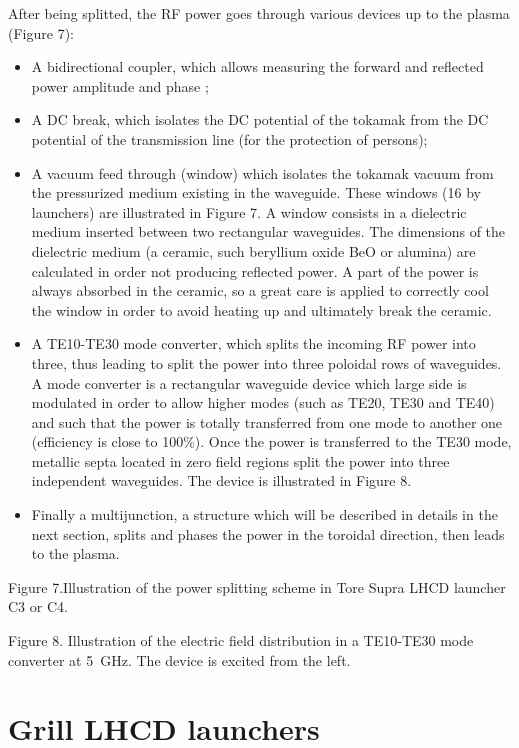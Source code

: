 After being splitted, the RF power goes through various devices up to the plasma (Figure 7): 
\begin{itemize}
 \item A bidirectional coupler, which allows measuring the forward and reflected power amplitude and phase ;
\item A DC break, which isolates the DC potential of the tokamak from the DC potential of the transmission line (for the protection of persons);
\item A vacuum feed through (window) which isolates the tokamak vacuum from the pressurized medium existing in the waveguide. These windows (16 by launchers) are illustrated in Figure 7. A window consists in a dielectric medium inserted between two rectangular waveguides. The dimensions of the dielectric medium (a ceramic, such beryllium oxide BeO or alumina) are calculated in order not producing reflected power. A part of the power is always absorbed in the ceramic, so a great care is applied to correctly cool the window in order to avoid heating up and ultimately break the ceramic.
\item A TE10-TE30 mode converter, which splits the incoming RF power into three, thus leading to split the power into three poloidal rows of waveguides. A mode converter is a rectangular waveguide device which large side is modulated in order to allow higher modes (such as TE20, TE30 and TE40) and such that the power is totally transferred from one mode to another one (efficiency is close to 100\%). Once the power is transferred to the TE30 mode, metallic septa located in zero field regions split the power into three independent waveguides. The device is illustrated in Figure 8.
\item Finally a multijunction, a structure which will be described in details in the next section, splits and phases the power in the toroidal direction, then leads to the plasma. 
\end{itemize}



Figure 7.Illustration of the power splitting scheme in Tore Supra LHCD launcher C3 or C4.  


Figure 8. Illustration of the electric field distribution in a TE10-TE30 mode converter at 5 GHz. The device is excited from the left.

\section{Grill LHCD launchers}
